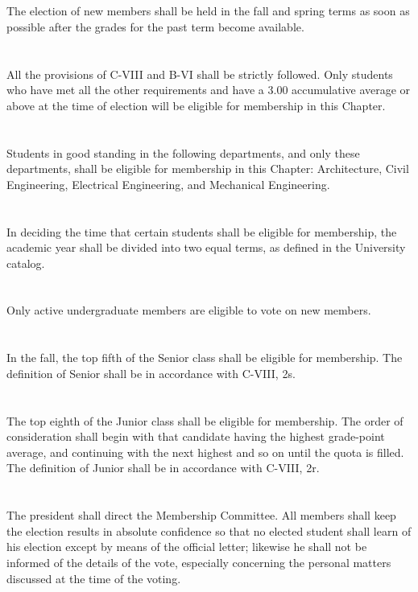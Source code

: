 \documentclass[12pt]{constitution}
\begin{document}
\section{}
The election of new members shall be held in the fall and spring terms as soon as possible after the grades for the past term become available.
\section{}
All the provisions of C-VIII and B-VI shall be strictly followed. Only students who have met all the other requirements and have a 3.00 accumulative average or above at the time of election will be eligible for membership in this Chapter.
\section{}
Students in good standing in the following departments, and only these departments, shall be eligible for membership in this Chapter: Architecture, Civil Engineering, Electrical Engineering, and Mechanical Engineering.
\section{}
In deciding the time that certain students shall be eligible for membership, the academic year shall be divided into two equal terms, as defined in the University catalog.
\section{}
Only active undergraduate members are eligible to vote on new members.
\section{}
In the fall, the top fifth of the Senior class shall be eligible for membership. The definition of Senior shall be in accordance with C-VIII, 2s.
\section{}
The top eighth of the Junior class shall be eligible for membership. The order of consideration shall begin with that candidate having the highest grade-point average, and
continuing with the next highest and so on until the quota is filled. The definition of Junior shall be in accordance with C-VIII, 2r.
\section{} %
The president shall direct the Membership Committee. All members shall keep the
election results in absolute confidence so that no elected student shall learn of his election
except by means of the official letter; likewise he shall not be informed of the details of the vote, especially concerning the personal matters discussed at the time of the voting.
\end{document}
